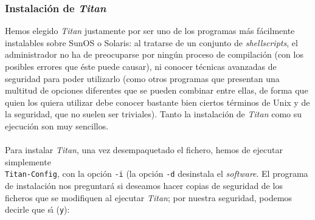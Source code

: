 \subsubsection{Instalaci\'on de {\it Titan}}
Hemos elegido {\it Titan} justamente por ser uno de los programas m\'as 
f\'acilmente instalables sobre SunOS o Solaris: al tratarse de un conjunto de
{\it shellscripts}, el administrador no ha de preocuparse por ning\'un proceso
de compilaci\'on (con los posibles errores que \'este puede causar), ni 
conocer t\'ecnicas avanzadas de seguridad para poder utilizarlo (como otros
programas que presentan una multitud de opciones diferentes que se pueden 
combinar entre ellas, de forma que quien los quiera utilizar debe conocer 
bastante bien ciertos t\'erminos de Unix y de la seguridad, que no suelen ser
triviales). Tanto la instalaci\'on de {\it Titan} como su ejecuci\'on son 
muy sencillos.\\
\\Para instalar {\it Titan}, una vez desempaquetado el fichero, hemos de 
ejecutar simplemente\\{\tt Titan-Config}, con la opci\'on {\tt -i} (la opci\'on 
{\tt -d} desinstala el {\it software}. El programa de instalaci\'on nos 
preguntar\'a si deseamos hacer copias de seguridad de los ficheros que se
modifiquen al ejecutar {\it Titan}; por nuestra seguridad, podemos decirle que
s\'{\i} ({\tt y}):
